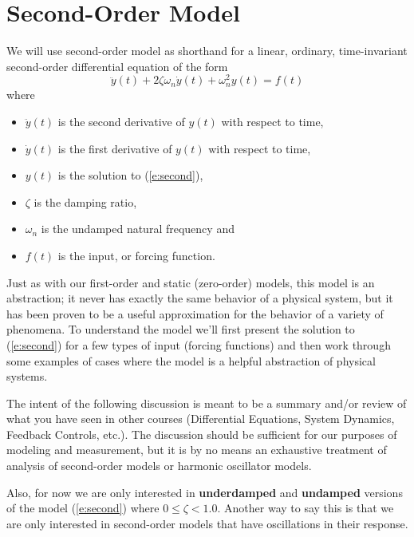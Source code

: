 
\section{Second-Order Model}
We will use \gls{second-order model} as shorthand for a linear, ordinary, time-invariant second-order differential equation of the form
\begin{equation} \label{e:second}
\ddot{y}(t) + 2 \zeta \omega_n \dot{y}(t) + \omega_n^2 y(t) = f(t)
\end{equation} 
where 
\begin{itemize}
\item $\ddot{y}(t)$ is the second derivative of $y(t)$ with respect to time,
\item $\dot{y}(t)$ is the first derivative of $y(t)$ with respect to time,
\item $y(t)$ is the solution to (\ref{e:second}),
\item $\zeta$ is the \gls{damping ratio},
\item $\omega_n$ is the \gls{undamped natural frequency} and
\item $f(t)$ is the input, or forcing function.
\end{itemize}
Just as with our first-order and static (zero-order) models, this model is an abstraction; it never has exactly the same behavior of a physical system, but it has been proven to be a useful approximation for the behavior of a variety of phenomena.  To understand the model we'll first present the solution to (\ref{e:second}) for a few types of input (forcing functions) and then work through some examples of cases where the model is a helpful abstraction of physical systems.

The intent of the following discussion is meant to be a summary and/or review of what you have seen in other courses (Differential Equations, System Dynamics, Feedback Controls, etc.).  The discussion should be sufficient for our purposes of modeling and measurement, but it is by no means an exhaustive treatment of analysis of second-order models or harmonic oscillator models.

Also, for now we are only interested in {\bf underdamped} and {\bf undamped} versions of the model (\ref{e:second}) where $0 \leq \zeta < 1.0$.  Another way to say this is that we are only interested in second-order models that have oscillations in their response.

